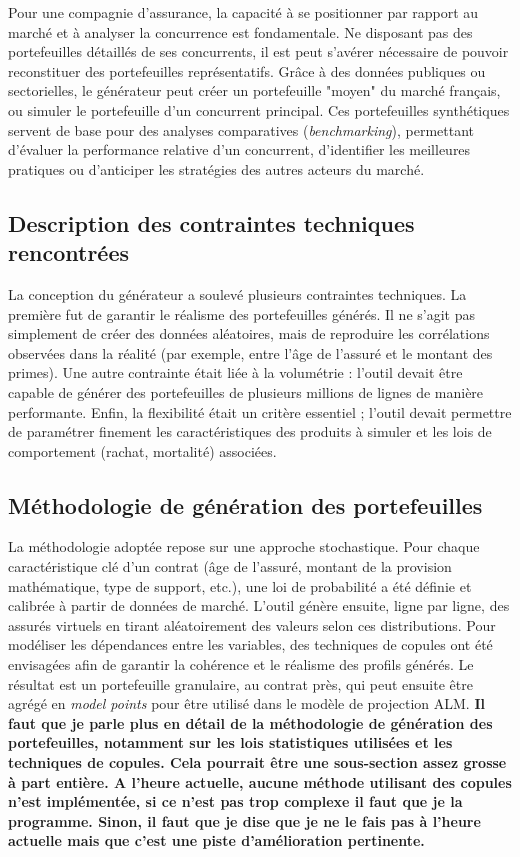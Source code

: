Pour une compagnie d'assurance, la capacité à se positionner par rapport au marché et à analyser la concurrence est fondamentale. Ne disposant pas des portefeuilles détaillés de ses concurrents, il est peut s'avérer nécessaire de pouvoir reconstituer des portefeuilles représentatifs. Grâce à des données publiques ou sectorielles, le générateur peut créer un portefeuille "moyen" du marché français, ou simuler le portefeuille d'un concurrent principal. Ces portefeuilles synthétiques servent de base pour des analyses comparatives (\textit{benchmarking}), permettant d'évaluer la performance relative d'un concurrent, d'identifier les meilleures pratiques ou d'anticiper les stratégies des autres acteurs du marché.

\subsection{Description des contraintes techniques rencontrées}

La conception du générateur a soulevé plusieurs contraintes techniques. La première fut de garantir le réalisme des portefeuilles générés. Il ne s'agit pas simplement de créer des données aléatoires, mais de reproduire les corrélations observées dans la réalité (par exemple, entre l'âge de l'assuré et le montant des primes). Une autre contrainte était liée à la volumétrie : l'outil devait être capable de générer des portefeuilles de plusieurs millions de lignes de manière performante. Enfin, la flexibilité était un critère essentiel ; l'outil devait permettre de paramétrer finement les caractéristiques des produits à simuler et les lois de comportement (rachat, mortalité) associées.

\subsection{Méthodologie de génération des portefeuilles}

La méthodologie adoptée repose sur une approche stochastique. Pour chaque caractéristique clé d'un contrat (âge de l'assuré, montant de la provision mathématique, type de support, etc.), une loi de probabilité a été définie et calibrée à partir de données de marché. L'outil génère ensuite, ligne par ligne, des assurés virtuels en tirant aléatoirement des valeurs selon ces distributions. Pour modéliser les dépendances entre les variables, des techniques de copules ont été envisagées afin de garantir la cohérence et le réalisme des profils générés. Le résultat est un portefeuille granulaire, au contrat près, qui peut ensuite être agrégé en \textit{model points} pour être utilisé dans le modèle de projection ALM. \textbf{Il faut que je parle plus en détail de la méthodologie de génération des portefeuilles, notamment sur les lois statistiques utilisées et les techniques de copules. Cela pourrait être une sous-section assez grosse à part entière. A l'heure actuelle, aucune méthode utilisant des copules n'est implémentée, si ce n'est pas trop complexe il faut que je la programme. Sinon, il faut que je dise que je ne le fais pas à l'heure actuelle mais que c'est une piste d'amélioration pertinente.}

